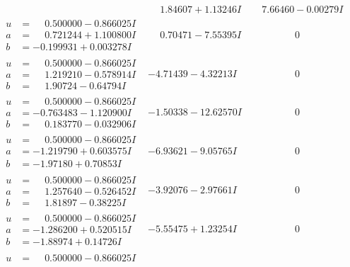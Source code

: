 \documentclass[1p]{elsarticle_modified}
\theoremstyle{definition}
\begin{document}
$$\begin{array}{c|c|c}
 & \phantom{-}1.84607 + 1.13246 I & \phantom{-}7.66460 - 0.00279 I \\ \hline\begin{aligned}
u &= \phantom{-}0.500000 - 0.866025 I \\
a &= \phantom{-}0.721244 + 1.100800 I \\
b &= -0.199931 + 0.003278 I\end{aligned}
 & \phantom{-}0.70471 - 7.55395 I & \phantom{-0.000000 } 0 \\ \hline\begin{aligned}
u &= \phantom{-}0.500000 - 0.866025 I \\
a &= \phantom{-}1.219210 - 0.578914 I \\
b &= \phantom{-}1.90724 - 0.64794 I\end{aligned}
 & -4.71439 - 4.32213 I & \phantom{-0.000000 } 0 \\ \hline\begin{aligned}
u &= \phantom{-}0.500000 - 0.866025 I \\
a &= -0.763483 - 1.120900 I \\
b &= \phantom{-}0.183770 - 0.032906 I\end{aligned}
 & -1.50338 - 12.62570 I & \phantom{-0.000000 } 0 \\ \hline\begin{aligned}
u &= \phantom{-}0.500000 - 0.866025 I \\
a &= -1.219790 + 0.603575 I \\
b &= -1.97180 + 0.70853 I\end{aligned}
 & -6.93621 - 9.05765 I & \phantom{-0.000000 } 0 \\ \hline\begin{aligned}
u &= \phantom{-}0.500000 - 0.866025 I \\
a &= \phantom{-}1.257640 - 0.526452 I \\
b &= \phantom{-}1.81897 - 0.38225 I\end{aligned}
 & -3.92076 - 2.97661 I & \phantom{-0.000000 } 0 \\ \hline\begin{aligned}
u &= \phantom{-}0.500000 - 0.866025 I \\
a &= -1.286200 + 0.520515 I \\
b &= -1.88974 + 0.14726 I\end{aligned}
 & -5.55475 + 1.23254 I & \phantom{-0.000000 } 0 \\ \hline\begin{aligned}
u &= \phantom{-}0.500000 - 0.866025 I \\

\end{aligned}
\end{array}$$
\end{document}
